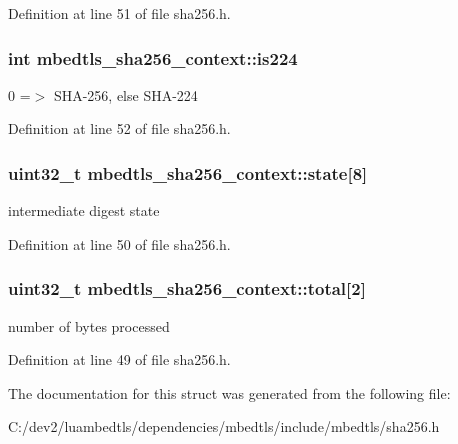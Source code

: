 Definition at line 51 of file sha256.\-h.

\hypertarget{structmbedtls__sha256__context_ac73158ffb252c4bd2ccb991653619cc1}{
\subsubsection[{is224}]{\setlength{\rightskip}{0pt plus 5cm}int mbedtls\-\_\-sha256\-\_\-context\-::is224}}\label{structmbedtls__sha256__context_ac73158ffb252c4bd2ccb991653619cc1}
0 =$>$ S\-H\-A-\/256, else S\-H\-A-\/224 

Definition at line 52 of file sha256.\-h.

\hypertarget{structmbedtls__sha256__context_a88df25a0934134bd8b686152ba763322}{
\subsubsection[{state}]{\setlength{\rightskip}{0pt plus 5cm}uint32\-\_\-t mbedtls\-\_\-sha256\-\_\-context\-::state\mbox{[}8\mbox{]}}}\label{structmbedtls__sha256__context_a88df25a0934134bd8b686152ba763322}
intermediate digest state 

Definition at line 50 of file sha256.\-h.

\hypertarget{structmbedtls__sha256__context_ab7444610a95153450180924862b2a0fa}{
\subsubsection[{total}]{\setlength{\rightskip}{0pt plus 5cm}uint32\-\_\-t mbedtls\-\_\-sha256\-\_\-context\-::total\mbox{[}2\mbox{]}}}\label{structmbedtls__sha256__context_ab7444610a95153450180924862b2a0fa}
number of bytes processed 

Definition at line 49 of file sha256.\-h.



The documentation for this struct was generated from the following file\-:\begin{DoxyCompactItemize}
\item 
C\-:/dev2/luambedtls/dependencies/mbedtls/include/mbedtls/sha256.\-h\end{DoxyCompactItemize}
